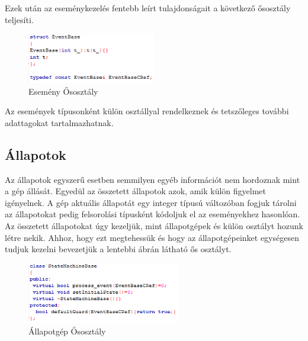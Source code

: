 \documentclass[a4paper,12pt]{report}
\begin{document}
Ezek után az eseménykezelés fentebb leírt tulajdonságait a következő ősosztály teljesíti.

\begin{figure}[hbtp]
\centering
\includegraphics[width=0.5\textwidth]{eventbase.png}
\caption{Esemény Ősosztály}
\label{fig:eb}
\end{figure}

Az események típusonként külön osztállyal rendelkeznek és tetszőleges további adattagokat tartalmazhatnak.

\subsection{Állapotok}

Az állapotok egyszerű esetben semmilyen egyéb információt nem hordoznak mint a gép állását. Egyedül az összetett állapotok azok, amik külön figyelmet igényelnek. A gép aktuális állapotát egy integer típusú változóban fogjuk tárolni az állapotokat pedig felsorolási típusként kódoljuk el az eseményekhez hasonlóan. Az összetett állapotokat úgy kezeljük, mint állapotgépek és külön osztályt hozunk létre nekik. Ahhoz, hogy ezt megtehessük és hogy az állapotgépeinket egységesen tudjuk kezelni bevezetjük a lentebbi ábrán látható ős osztályt.
\begin{figure}[hbtp]
\centering
\includegraphics[width=0.6\textwidth]{smbase.png}
\caption{Állapotgép Ősosztály}
\label{fig:smbas}
\end{figure}
\end{document}
